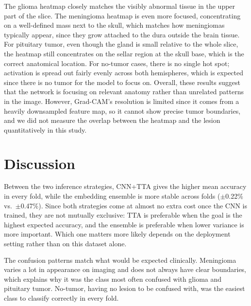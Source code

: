 \documentclass[conference]{IEEEtran}
\begin{document}
The glioma heatmap closely matches the visibly abnormal tissue in the upper part of the slice. The meningioma heatmap is even more focused, concentrating on a well-defined mass next to the skull, which matches how meningiomas typically appear, since they grow attached to the dura outside the brain tissue. For pituitary tumor, even though the gland is small relative to the whole slice, the heatmap still concentrates on the sellar region at the skull base, which is the correct anatomical location. For no-tumor cases, there is no single hot spot; activation is spread out fairly evenly across both hemispheres, which is expected since there is no tumor for the model to focus on. Overall, these results suggest that the network is focusing on relevant anatomy rather than unrelated patterns in the image. However, Grad-CAM's resolution is limited since it comes from a heavily downsampled feature map, so it cannot show precise tumor boundaries, and we did not measure the overlap between the heatmap and the lesion quantitatively in this study.


\section{Discussion}
Between the two inference strategies, CNN+TTA gives the higher mean accuracy in every fold, while the embedding ensemble is more stable across folds ($\pm$0.22\% vs.\ $\pm$0.47\%). Since both strategies come at almost no extra cost once the CNN is trained, they are not mutually exclusive: TTA is preferable when the goal is the highest expected accuracy, and the ensemble is preferable when lower variance is more important. Which one matters more likely depends on the deployment setting rather than on this dataset alone.

The confusion patterns match what would be expected clinically. Meningioma varies a lot in appearance on imaging and does not always have clear boundaries, which explains why it was the class most often confused with glioma and pituitary tumor. No-tumor, having no lesion to be confused with, was the easiest class to classify correctly in every fold.
\end{document}
